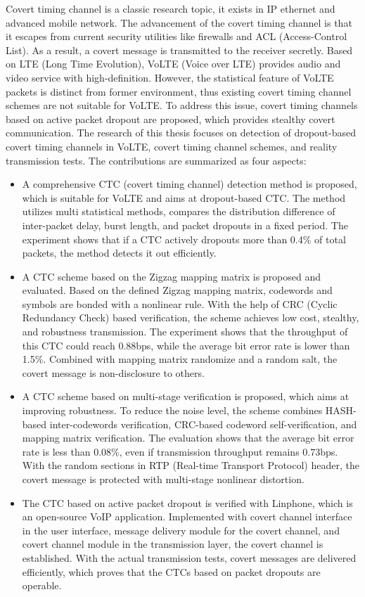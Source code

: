 \begin{englishabstract}

   Covert timing channel is a classic research topic, it exists in IP ethernet and advanced mobile network. The advancement of the covert timing channel is that it escapes from current security utilities like firewalls and ACL (Access-Control List). As a result, a covert message is transmitted to the receiver secretly. Based on LTE (Long Time Evolution), VoLTE (Voice over LTE) provides audio and video service with high-definition. However, the statistical feature of VoLTE packets is distinct from former environment, thus existing covert timing channel schemes are not suitable for VoLTE. To address this issue, covert timing channels based on active packet dropout are proposed, which provides stealthy covert communication. The research of this thesis focuses on detection of dropout-based covert timing channels in VoLTE, covert timing channel schemes, and reality transmission tests. The contributions are summarized as four aspects: 
\begin{itemize}
   \item A comprehensive CTC (covert timing channel) detection method is proposed, which is suitable for VoLTE and aims at dropout-based CTC. The method utilizes multi statistical methods, compares the distribution difference of inter-packet delay, burst length, and packet dropouts in a fixed period. The experiment shows that if a CTC actively dropouts more than 0.4\% of total packets, the method detects it out efficiently.
   \item A CTC scheme based on the Zigzag mapping matrix is proposed and evaluated. Based on the defined Zigzag mapping matrix, codewords and symbols are bonded with a nonlinear rule. With the help of CRC (Cyclic Redundancy Check) based verification, the scheme achieves low cost, stealthy, and robustness transmission. The experiment shows that the throughput of this CTC could reach 0.88bps, while the average bit error rate is lower than 1.5\%. Combined with mapping matrix randomize and a random salt, the covert message is non-disclosure to others.
   \item A CTC scheme based on multi-stage verification is proposed, which aims at improving robustness. To reduce the noise level, the scheme combines HASH-based inter-codewords verification, CRC-based codeword self-verification, and mapping matrix verification. The evaluation shows that the average bit error rate is less than 0.08\%, even if transmission throughput remains 0.73bps. With the random sections in RTP (Real-time Transport Protocol) header, the covert message is protected with multi-stage nonlinear distortion.
   \item The CTC based on active packet dropout is verified with Linphone, which is an open-source VoIP application. Implemented with covert channel interface in the user interface, message delivery module for the covert channel, and covert channel module in the transmission layer, the covert channel is established. With the actual transmission tests, covert messages are delivered efficiently, which proves that the CTCs based on packet dropouts are operable.
\end{itemize}
   
\end{englishabstract}
